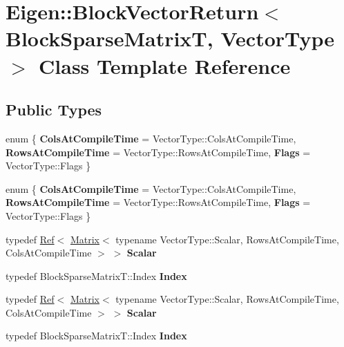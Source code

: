 \hypertarget{class_eigen_1_1_block_vector_return}{}\section{Eigen\+:\+:Block\+Vector\+Return$<$ Block\+Sparse\+MatrixT, Vector\+Type $>$ Class Template Reference}
\label{class_eigen_1_1_block_vector_return}
\subsection*{Public Types}
\begin{DoxyCompactItemize}
\item 
\mbox{\label{class_eigen_1_1_block_vector_return_a20ebef1dd550293f508117808d37c90b}} 
enum \{ {\bfseries Cols\+At\+Compile\+Time} = Vector\+Type\+:\+:Cols\+At\+Compile\+Time, 
{\bfseries Rows\+At\+Compile\+Time} = Vector\+Type\+:\+:Rows\+At\+Compile\+Time, 
{\bfseries Flags} = Vector\+Type\+:\+:Flags
 \}
\item 
\mbox{\label{class_eigen_1_1_block_vector_return_a944e070486a4021f241e837c1ba0fea1}} 
enum \{ {\bfseries Cols\+At\+Compile\+Time} = Vector\+Type\+:\+:Cols\+At\+Compile\+Time, 
{\bfseries Rows\+At\+Compile\+Time} = Vector\+Type\+:\+:Rows\+At\+Compile\+Time, 
{\bfseries Flags} = Vector\+Type\+:\+:Flags
 \}
\item 
\mbox{\label{class_eigen_1_1_block_vector_return_a4ae10516cca3a3ebb3dc05a5bb425f65}} 
typedef \hyperlink{group___core___module_class_eigen_1_1_ref}{Ref}$<$ \hyperlink{group___core___module_class_eigen_1_1_matrix}{Matrix}$<$ typename Vector\+Type\+::\+Scalar, Rows\+At\+Compile\+Time, Cols\+At\+Compile\+Time $>$ $>$ {\bfseries Scalar}
\item 
\mbox{\label{class_eigen_1_1_block_vector_return_a4d6e7f86756b11e2d65f1cd83d786723}} 
typedef Block\+Sparse\+Matrix\+T\+::\+Index {\bfseries Index}
\item 
\mbox{\label{class_eigen_1_1_block_vector_return_a4ae10516cca3a3ebb3dc05a5bb425f65}} 
typedef \hyperlink{group___core___module_class_eigen_1_1_ref}{Ref}$<$ \hyperlink{group___core___module_class_eigen_1_1_matrix}{Matrix}$<$ typename Vector\+Type\+::\+Scalar, Rows\+At\+Compile\+Time, Cols\+At\+Compile\+Time $>$ $>$ {\bfseries Scalar}
\item 
\mbox{\label{class_eigen_1_1_block_vector_return_a4d6e7f86756b11e2d65f1cd83d786723}} 
typedef Block\+Sparse\+Matrix\+T\+::\+Index {\bfseries Index}
\end{DoxyCompactItemize}
